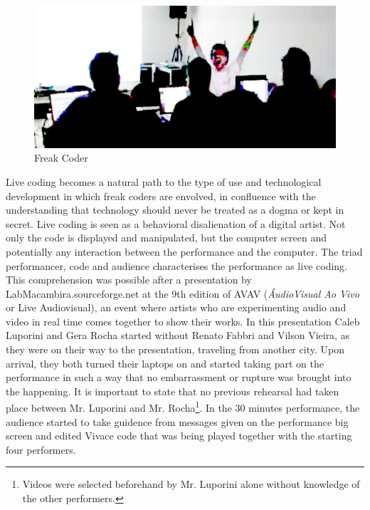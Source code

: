 \documentclass[letterpaper, 12pt]{article}
\begin{document}
\begin{figure}[htpb]
  \begin{center}
    \includegraphics[scale=.4]{img/fig_freakcoder.png}
    \caption{Freak Coder}
    \label{fig:freakcoder}
  \end{center}
\end{figure}

Live coding becomes a natural path to the type of use and
technological development in which freak coders are envolved, in
confluence with the understanding that technology should never be
treated as a dogma or kept in secret. Live coding is seen as a
behavioral disalienation of a digital artist. Not only the code is
displayed and manipulated, but the computer screen and potentially any
interaction between the performance and the computer. The triad
performancer, code and audience characterises the performance
as live coding.  This comprehension was possible after a presentation
by LabMacambira.sourceforge.net at the 9th edition of AVAV
(\textit{\'{A}udioVisual Ao Vivo} or Live Audiovisual), an event where
artists who are experimenting audio and video in real time comes
together to show their works. In this presentation Caleb Luporini and
Gera Rocha started without Renato Fabbri and Vilson Vieira, as they
were on their way to the presentation, traveling from another
city. Upon arrival, they both turned their laptops on and started
taking part on the performance in such a way that no embarrassment or
rupture was brought into the happening.  It is important to state that
no previous rehearsal had taken place between Mr. Luporini and
Mr. Rocha\footnote{Videos were selected beforehand by Mr. Luporini
  alone without knowledge of the other performers.}. In the 30 minutes
performance, the audience started to take guidence from messages given
on the performance big screen and edited Vivace code that was being
played together with the starting four performers.
\end{document}
